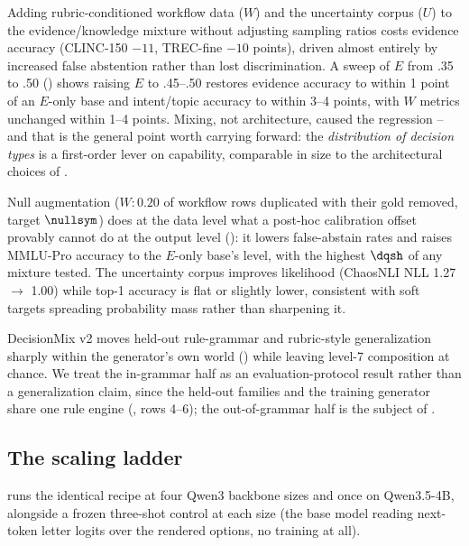 Adding rubric-conditioned workflow data ($W$) and the uncertainty corpus ($U$) to the
evidence/knowledge mixture without adjusting sampling ratios costs evidence accuracy (CLINC-150 $-11$,
TREC-fine $-10$ points), driven almost entirely by increased false abstention rather than lost
discrimination. A sweep of $E$ from .35 to .50 () shows raising $E$ to .45--.50
restores evidence accuracy to within 1 point of an $E$-only base and intent/topic accuracy to within
3--4 points, with $W$ metrics unchanged within 1--4 points. Mixing, not architecture, caused the
regression -- and that is the general point worth carrying forward: the \emph{distribution of decision
types} is a first-order lever on capability, comparable in size to the architectural choices of
.

Null augmentation ($W{:}0.20$ of workflow rows duplicated with their gold removed, target $\nullsym$)
does at the data level what a post-hoc calibration offset provably cannot do at the output level
(): it lowers false-abstain rates and raises MMLU-Pro accuracy to the
$E$-only base's level, with the highest $\dqsh$ of any mixture tested. The uncertainty corpus improves
likelihood (ChaosNLI NLL 1.27 $\to$ 1.00) while top-1 accuracy is flat or slightly lower, consistent
with soft targets spreading probability mass rather than sharpening it.

DecisionMix v2 moves held-out rule-grammar and rubric-style generalization sharply within the
generator's own world () while leaving level-7 composition at chance. We treat the
in-grammar half as an evaluation-protocol result rather than a generalization claim, since the held-out
families and the training generator share one rule engine (, rows 4--6); the
out-of-grammar half is the subject of .

\subsection{The scaling ladder}
\label{sec:train:ladder}

 runs the identical recipe at four Qwen3 backbone sizes and once on Qwen3.5-4B,
alongside a frozen three-shot control at each size (the base model reading next-token letter logits
over the rendered options, no training at all).

